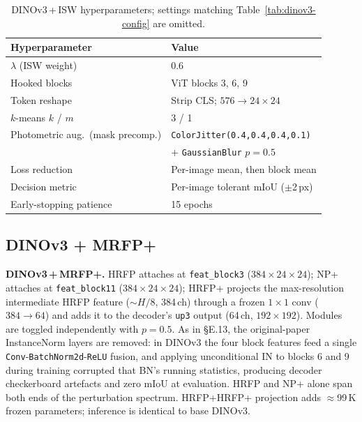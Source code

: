 \begin{table}[h]
\centering
\caption{DINOv3\,+\,ISW hyperparameters; settings matching
Table~\ref{tab:dinov3-config} are omitted.}
\label{tab:dinov3-isw}
\small
\begin{tabular}{@{}ll@{}}
\toprule
\textbf{Hyperparameter} & \textbf{Value} \\
\midrule
$\lambda$ (ISW weight)         & 0.6 \\
Hooked blocks                  & ViT blocks 3, 6, 9 \\
Token reshape                  & Strip CLS; $576\to24{\times}24$ \\
$k$-means $k$ / $m$            & 3 / 1 \\
Photometric aug.\ (mask precomp.)\!\!
  & \texttt{ColorJitter(0.4,0.4,0.4,0.1)} \\
  & + \texttt{GaussianBlur} $p{=}0.5$ \\
Loss reduction                 & Per-image mean, then block mean \\
Decision metric                & Per-image tolerant mIoU ($\pm$2\,px) \\
Early-stopping patience        & 15 epochs \\
\bottomrule
\end{tabular}
\end{table}

\subsection{DINOv3 + MRFP+}

\textbf{DINOv3\,+\,MRFP+.}
HRFP attaches at \texttt{feat\_block3} ($384{\times}24{\times}24$);
NP+ attaches at \texttt{feat\_block11} ($384{\times}24{\times}24$);
HRFP+ projects the max-resolution intermediate HRFP feature
($\sim$$H/8$, 384\,ch) through a frozen $1{\times}1$ conv
($384{\to}64$) and adds it to the decoder's \texttt{up3} output
(64\,ch, $192{\times}192$).  Modules are toggled independently with
$p{=}0.5$.  As in \S E.13, the original-paper InstanceNorm layers are
removed: in DINOv3 the four block features feed a single
\texttt{Conv}-\texttt{BatchNorm2d}-\texttt{ReLU} fusion, and applying
unconditional IN to blocks 6 and 9 during training corrupted that BN's
running statistics, producing decoder checkerboard artefacts and zero
mIoU at evaluation.  HRFP and NP+ alone span both ends of the
perturbation spectrum.  HRFP+HRFP+ projection adds $\approx$99\,K
frozen parameters; inference is identical to base DINOv3.

